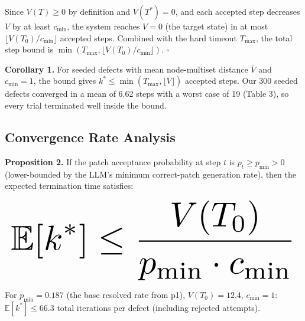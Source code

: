 \documentclass{article}
\begin{document}
Since $V(T) \geq 0$ by definition and $V(T^*) = 0$, and each accepted step decreases $V$ by at least $c_{\min}$, the system reaches $V = 0$ (the target state) in at most $\lfloor V(T_0)/c_{\min} \rfloor$ accepted steps. Combined with the hard timeout $T_{\max}$, the total step bound is $\min(T_{\max}, \lfloor V(T_0)/c_{\min} \rfloor)$. $\square$

\textbf{Corollary 1.} For seeded defects with mean node-multiset distance $\bar{V}$ and $c_{\min} = 1$, the bound gives $k^* \leq \min(T_{\max}, \lfloor \bar{V} \rfloor)$ accepted steps. Our 300 seeded defects converged in a mean of 6.62 steps with a worst case of 19 (Table 3), so every trial terminated well inside the bound.


\subsection{Convergence Rate Analysis}


\textbf{Proposition 2.} If the patch acceptance probability at step $t$ is $p_t \geq p_{\min} > 0$ (lower-bounded by the LLM's minimum correct-patch generation rate), then the expected termination time satisfies:





















\begin{equation}
\resizebox{\columnwidth}{!}{$\displaystyle
\begin{aligned}
\mathbb{E}[k^*] \leq \frac{V(T_0)}{p_{\min} \cdot c_{\min}}
\end{aligned}
$}
\end{equation}





















For $p_{\min} = 0.187$ (the base resolved rate from p1), $V(T_0) = 12.4$, $c_{\min} = 1$: $\mathbb{E}[k^*] \leq 66.3$ total iterations per defect (including rejected attempts).
\end{document}
